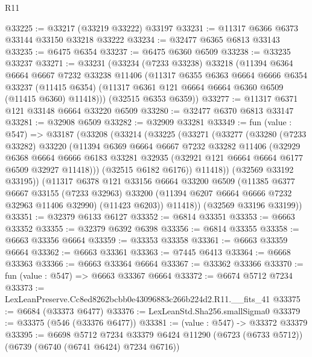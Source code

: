 \begin{lexlean}{R11}
\begin{coremodule}
@33225 := @33217 (@33219 @33222) @33197
@33231 := @11317 @6366 @6373 @33144 @33150 @33218 @33222
@33234 := @32477 @6365 @6813 @33143
@33235 := @6475 @6354
@33237 := @6475 @6360 @6509
@33238 := @33235 @33237
@33271 := @33231
    (@33234
      (@7233 @33238)
      @33218
      (@11394
        @6364
        @6664
        @6667
        @7232
        @33238
        @11406
        (@11317
          @6355
          @6363
          @6664
          @6666
          @6354
          @33237
          (@11415 @6354)
          (@11317 @6361 @121 @6664 @6664 @6360 @6509 (@11415 @6360) @11418)))
      (@32515 @6353 @6359))
@33277 := @11317 @6371 @121 @33148 @6664 @33220 @6509
@33280 := @32477 @6370 @6813 @33147
@33281 := @32908 @6509
@33282 := @32909 @33281
@33349 := fun (value : @547) =>
  @33187
    (@33208
      (@33214
        (@33225
          (@33271
            (@33277
              (@33280
                (@7233 @33282)
                @33220
                (@11394
                  @6369
                  @6664
                  @6667
                  @7232
                  @33282
                  @11406
                  (@32929
                    @6368
                    @6664
                    @6666
                    @6183
                    @33281
                    @32935
                    (@32921 @121 @6664 @6664 @6177 @6509 @32927 @11418)))
                (@32515 @6182 @6176))
              @11418))
          (@32569 @33192 @33195))
        (@11317
          @6378
          @121
          @33156
          @6664
          @33200
          @6509
          (@11385
            @6377
            @6667
            @33155
            (@7233 @32963)
            @33200
            (@11394 @6207 @6664 @6666 @7232 @32963 @11406 @32990)
            (@11423 @6203))
          @11418))
      (@32569 @33196 @33199))
@33351 := @32379 @6133 @6127
@33352 := @6814 @33351
@33353 := @6663 @33352
@33355 := @32379 @6392 @6398
@33356 := @6814 @33355
@33358 := @6663 @33356 @6664
@33359 := @33353 @33358
@33361 := @6663 @33359 @6664
@33362 := @6663 @33361
@33363 := @7445 @6413
@33364 := @6668 @33363
@33366 := @6663 @33364 @6664
@33367 := @33362 @33366
@33370 := fun (value : @547) => @6663 @33367 @6664
@33372 := @6674 @5712 @7234
@33373 := LexLeanPreserve.Cc8ed8262bcbb0e43096883c266b224d2.R11.__fits_41
@33375 := @6684 (@33373 @6477)
@33376 := LexLeanStd.Sha256.smallSigma0
@33379 := @33375 (@546 (@33376 @6477))
@33381 := (value : @547) -> @33372 @33379
@33395 := @6698
    @5712
    @7234
    @33379
    @6424
    @11290
    (@6723 (@6733 @5712))
    (@6739 (@6740 (@6741 @6424) @7234 @6716))

\end{coremodule}
\end{lexlean}
